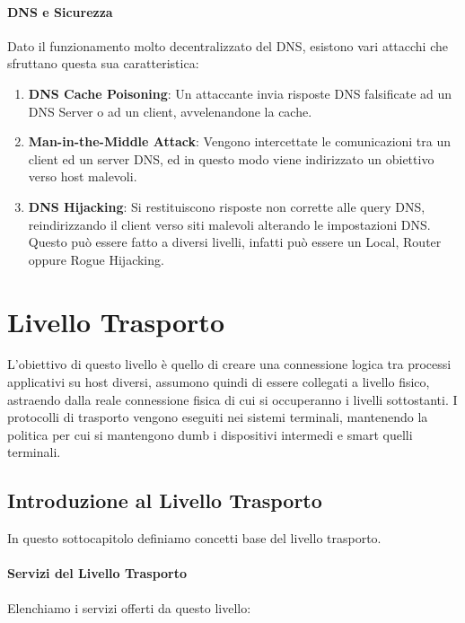 \documentclass{article}
\begin{document}
\paragraph{DNS e Sicurezza} Dato il funzionamento molto decentralizzato del DNS, esistono vari attacchi che sfruttano questa sua caratteristica:

\begin{enumerate}
    \item \textbf{DNS Cache Poisoning}: Un attaccante invia risposte DNS falsificate ad un DNS Server o ad un client, avvelenandone la cache.
    \item \textbf{Man-in-the-Middle Attack}: Vengono intercettate le comunicazioni tra un client ed un server DNS, ed in questo modo viene indirizzato un obiettivo verso host malevoli.
    \item \textbf{DNS Hijacking}: Si restituiscono risposte non corrette alle query DNS, reindirizzando il client verso siti malevoli alterando le impostazioni DNS. Questo può essere fatto
    a diversi livelli, infatti può essere un Local, Router oppure Rogue Hijacking.
\end{enumerate}

\newpage

\section{Livello Trasporto}

L'obiettivo di questo livello è quello di creare una connessione logica tra processi applicativi su host diversi, assumono quindi di essere collegati a livello fisico, astraendo dalla reale connessione fisica di cui si occuperanno i livelli sottostanti. I protocolli di trasporto vengono
eseguiti nei sistemi terminali, mantenendo la politica per cui si mantengono dumb i dispositivi intermedi e smart quelli terminali.

\subsection{Introduzione al Livello Trasporto}

In questo sottocapitolo definiamo concetti base del livello trasporto.

\paragraph{Servizi del Livello Trasporto} Elenchiamo i servizi offerti da questo livello:
\end{document}
